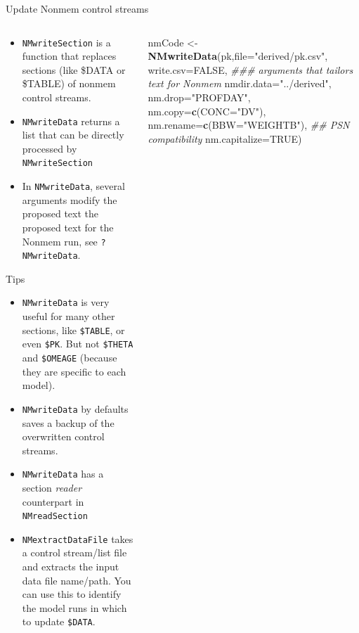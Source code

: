 \documentclass[
  8pt,
  ignorenonframetext,
  aspectratio=169]{beamer}
\newenvironment{Shaded}{\begin{snugshade}}{\end{snugshade}}
\newcommand{\CommentTok}[1]{\textcolor[rgb]{0.56,0.35,0.01}{\textit{#1}}}
\newcommand{\DataTypeTok}[1]{\textcolor[rgb]{0.13,0.29,0.53}{#1}}
\newcommand{\KeywordTok}[1]{\textcolor[rgb]{0.13,0.29,0.53}{\textbf{#1}}}
\newcommand{\NormalTok}[1]{#1}
\newcommand{\OtherTok}[1]{\textcolor[rgb]{0.56,0.35,0.01}{#1}}
\newcommand{\StringTok}[1]{\textcolor[rgb]{0.31,0.60,0.02}{#1}}
\begin{document}
\begin{frame}[fragile]{Update Nonmem control streams}
\protect\hypertarget{update-nonmem-control-streams}{}
\begin{columns}[T]
\begin{column}{0.48\textwidth}
\begin{itemize}
\item
  \texttt{NMwriteSection} is a function that replaces sections (like
  \$DATA or \$TABLE) of nonmem control streams.
\item
  \texttt{NMwriteData} returns a list that can be directly processed by
  \texttt{NMwriteSection}
\item
  In \texttt{NMwriteData}, several arguments modify the proposed text
  the proposed text for the Nonmem run, see \texttt{?NMwriteData}.
\end{itemize}

\begin{block}{Tips}
\protect\hypertarget{tips}{}
\begin{itemize}
\item
  \texttt{NMwriteData} is very useful for many other sections, like
  \texttt{\$TABLE}, or even \texttt{\$PK}. But not \texttt{\$THETA} and
  \texttt{\$OMEAGE} (because they are specific to each model).
\item
  \texttt{NMwriteData} by defaults saves a backup of the overwritten
  control streams.
\item
  \texttt{NMwriteData} has a section \emph{reader} counterpart in
  \texttt{NMreadSection}
\item
  \texttt{NMextractDataFile} takes a control stream/list file and
  extracts the input data file name/path. You can use this to identify
  the model runs in which to update \texttt{\$DATA}.
\end{itemize}
\end{block}
\end{column}

\begin{column}{0.48\textwidth}
\footnotesize

\begin{Shaded}
\begin{Highlighting}[]
\NormalTok{nmCode \textless{}{-}}\StringTok{ }\KeywordTok{NMwriteData}\NormalTok{(pk,}\DataTypeTok{file=}\StringTok{"derived/pk.csv"}\NormalTok{,}
                      \DataTypeTok{write.csv=}\OtherTok{FALSE}\NormalTok{,}
\CommentTok{\#\#\# arguments that tailors text for Nonmem}
                      \DataTypeTok{nmdir.data=}\StringTok{"../derived"}\NormalTok{,}
                      \DataTypeTok{nm.drop=}\StringTok{"PROFDAY"}\NormalTok{,}
                      \DataTypeTok{nm.copy=}\KeywordTok{c}\NormalTok{(}\DataTypeTok{CONC=}\StringTok{"DV"}\NormalTok{),}
                      \DataTypeTok{nm.rename=}\KeywordTok{c}\NormalTok{(}\DataTypeTok{BBW=}\StringTok{"WEIGHTB"}\NormalTok{),}
                      \CommentTok{\#\# PSN compatibility}
                      \DataTypeTok{nm.capitalize=}\OtherTok{TRUE}\NormalTok{)}
\end{Highlighting}
\end{Shaded}


\end{column}
\end{columns}
\end{frame}
\end{document}
